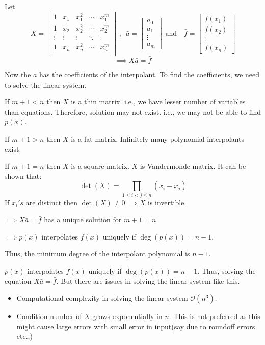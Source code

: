\documentclass[
]{book}
\providecommand{\tightlist}{%
  \setlength{\itemsep}{0pt}\setlength{\parskip}{0pt}}
\begin{document}
Let \[X = \begin{bmatrix}
1 & x_1 & x_1^2 & \cdots & x_1^m\\
1 & x_2 & x_2^2 & \cdots & x_2^m\\
\vdots & \vdots & \vdots & \ddots & \vdots \\
1 & x_n & x_n^2 & \cdots & x_n^m\\
\end{bmatrix}\text{ ,} \ \  \ \bar{a} = \begin{bmatrix}a_0\\a_1\\ \vdots \\a_m \end{bmatrix}  \text{ and } \ \ \ \bar{f}=  \begin{bmatrix} f(x_1)\\f(x_2)\\ \vdots \\f(x_n) \end{bmatrix}\]
\[\implies X\bar{a} = \bar{f}\]

Now the \(\bar{a}\) has the coefficients of the interpolant. To find the coefficients, we need to solve the linear system.

If \(m+1<n\) then \(X\) is a thin matrix. i.e., we have lesser number of variables than equations. Therefore, solution may not exist. i.e., we may not be able to find \(p(x)\).

If \(m+1>n\) then \(X\) is a fat matrix. Infinitely many polynomial interpolants exist.

If \(m+1=n\) then \(X\) is a square matrix. \(X\) is Vandermonde matrix. It can be shown that:
\[\det(X) = \prod_{1\le i<j\le n}(x_i-x_j)\]
If \(x_i's\) are distinct then \(\det(X)\neq 0 \implies X\) is invertible.

\(\implies X\bar{a} = \bar{f}\) has a unique solution for \(m+1=n\).

\(\implies p(x)\) interpolates \(f(x)\) uniquely if \(\deg(p(x)) = n-1\).

Thus, the minimum degree of the interpolant polynomial is \(n-1\).

\(p(x)\) interpolates \(f(x)\) uniquely if \(\deg(p(x))=n-1\). Thus, solving the equation \(X\bar{a} = \bar{f}\).
But there are issues in solving the linear system like this.

\begin{itemize}
\tightlist
\item
  Computational complexity in solving the linear system \(\mathcal{O}(n^3)\).
\item
  Condition number of \(X\) grows exponentially in \(n\). This is not preferred as this might cause large errors with small error in input(say due to roundoff errors etc.,)
\end{itemize}
\end{document}
